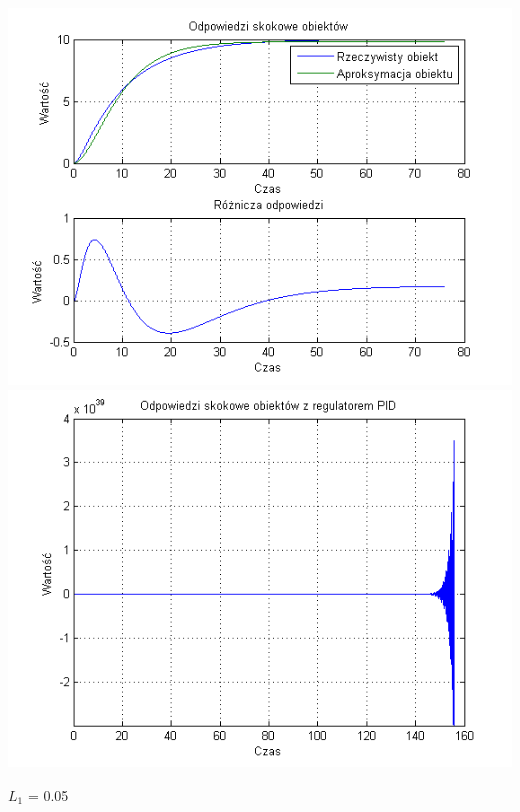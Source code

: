 \documentclass[10pt,a4paper]{article}
\begin{document}
\begin{center}
\includegraphics[scale=1]{images/dwa/skrypt_209.png}\\
\includegraphics[scale=1]{images/dwa/skrypt_210.png}\\
\end{center}
\newpage
$L_1$ = 0.05
\end{document}
